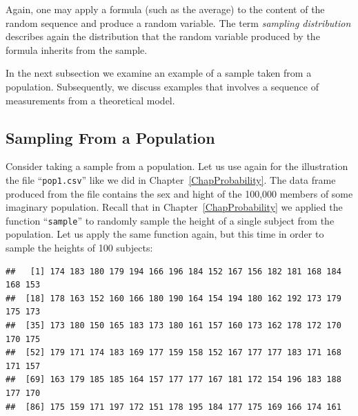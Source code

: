 \documentclass[]{krantz}
\makeatletter
\newenvironment{Shaded}{\begin{snugshade}}{\end{snugshade}}
\newcommand{\DecValTok}[1]{\textcolor[rgb]{0.00,0.00,0.81}{#1}}
\newcommand{\FloatTok}[1]{\textcolor[rgb]{0.00,0.00,0.81}{#1}}
\newcommand{\KeywordTok}[1]{\textcolor[rgb]{0.13,0.29,0.53}{\textbf{#1}}}
\newcommand{\NormalTok}[1]{#1}
\newcommand{\OperatorTok}[1]{\textcolor[rgb]{0.81,0.36,0.00}{\textbf{#1}}}
\newcommand{\StringTok}[1]{\textcolor[rgb]{0.31,0.60,0.02}{#1}}
\newenvironment{kframe}{%
\medskip{}
\setlength{\fboxsep}{.8em}
 \def\at@end@of@kframe{}%
 \ifinner\ifhmode%
  \def\at@end@of@kframe{\end{minipage}}%
  \begin{minipage}{\columnwidth}%
 \fi\fi%
 \def\FrameCommand##1{\hskip\@totalleftmargin \hskip-\fboxsep
 \colorbox{shadecolor}{##1}\hskip-\fboxsep
     \hskip-\linewidth \hskip-\@totalleftmargin \hskip\columnwidth}%
 \MakeFramed {\advance\hsize-\width
   \@totalleftmargin\z@ \linewidth\hsize
   \@setminipage}}%
 {\par\unskip\endMakeFramed%
 \at@end@of@kframe}
\renewenvironment{Shaded}{\begin{kframe}}{\end{kframe}}
\theoremstyle{definition}
\theoremstyle{definition}
\theoremstyle{definition}
\theoremstyle{remark}
\makeatother
\begin{document}
Again, one may apply a formula (such as the average) to the content of
the random sequence and produce a random variable. The term \emph{sampling
distribution} describes again the distribution that the random variable
produced by the formula inherits from the sample.

In the next subsection we examine an example of a sample taken from a
population. Subsequently, we discuss examples that involves a sequence
of measurements from a theoretical model.

\hypertarget{sampling-from-a-population}{%
\subsection{Sampling From a Population}\label{sampling-from-a-population}}

Consider taking a sample from a population. Let us use again for the
illustration the file ``\texttt{pop1.csv}'' like we did in
Chapter~\ref{ChapProbability}. The data frame produced from the file
contains the sex and hight of the 100,000 members of some imaginary
population. Recall that in Chapter~\ref{ChapProbability} we applied the
function ``\texttt{sample}'' to randomly sample the height of a single subject
from the population. Let us apply the same function again, but this time
in order to sample the heights of 100 subjects:

\begin{Shaded}
\end{Shaded}

\begin{verbatim}
##   [1] 174 183 180 179 194 166 196 184 152 167 156 182 181 168 184 168 153
##  [18] 178 163 152 160 166 180 190 164 154 194 180 162 192 173 179 175 173
##  [35] 173 180 150 165 183 173 180 161 157 160 173 162 178 172 170 170 175
##  [52] 179 171 174 183 169 177 159 158 152 167 177 177 183 171 168 171 157
##  [69] 163 179 185 185 164 157 177 177 167 181 172 154 196 183 188 177 170
##  [86] 175 159 171 197 172 151 178 195 184 177 175 169 166 174 161
\end{verbatim}
\end{document}

